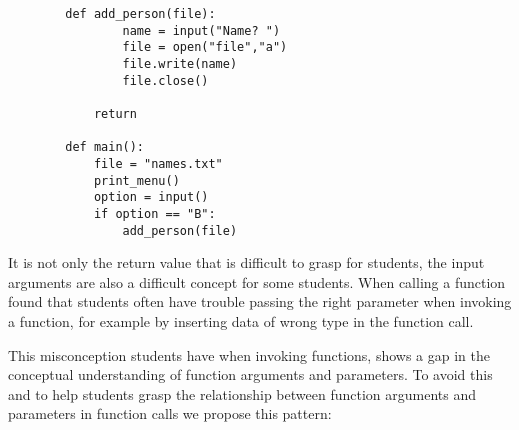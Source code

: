 \begin{description}
\begin{verbatim}
        def add_person(file):
                name = input("Name? ")
                file = open("file","a")
                file.write(name)
                file.close()
                
            return

        def main():
            file = "names.txt"
            print_menu()
            option = input()
            if option == "B":
                add_person(file)
        \end{verbatim}
\hfill

\end{description}

It is not only the return value that is difficult to grasp for students, 
the 
input arguments are also a difficult concept for some students. When 
calling a 
function \textcite{AltadmriBrown2015} found that students often have 
trouble passing the right parameter when invoking a function, for example 
by inserting data of wrong type in the function call. 

This misconception students have when invoking functions, shows a gap in 
the conceptual understanding of function arguments and parameters. To 
avoid this and to help students grasp the relationship between function 
arguments and parameters in function calls we propose this pattern:

